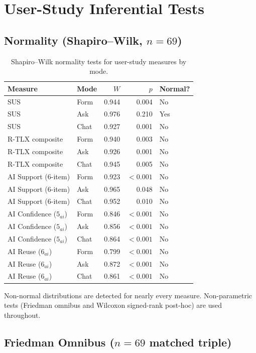 \section{User-Study Inferential Tests}
\label{app:inf-survey}

\subsection{Normality (Shapiro--Wilk, $n = 69$)}

\begin{table}[H]
\centering
\caption{Shapiro--Wilk normality tests for user-study measures by mode.}
\label{tab:app-survey-normality}
\small
\begin{tabular}{@{}l l r r l@{}}
\toprule
Measure & Mode & $W$ & $p$ & Normal? \\
\midrule
SUS & Form & 0.944 & 0.004 & No \\
SUS & Ask  & 0.976 & 0.210 & Yes \\
SUS & Chat & 0.927 & 0.001 & No \\
R-TLX composite & Form & 0.940 & 0.003 & No \\
R-TLX composite & Ask  & 0.926 & 0.001 & No \\
R-TLX composite & Chat & 0.945 & 0.005 & No \\
AI Support (6-item) & Form & 0.923 & $<0.001$ & No \\
AI Support (6-item) & Ask  & 0.965 & 0.048 & No \\
AI Support (6-item) & Chat & 0.952 & 0.010 & No \\
AI Confidence ($5_{ai}$) & Form & 0.846 & $<0.001$ & No \\
AI Confidence ($5_{ai}$) & Ask  & 0.856 & $<0.001$ & No \\
AI Confidence ($5_{ai}$) & Chat & 0.864 & $<0.001$ & No \\
AI Reuse ($6_{ai}$) & Form & 0.799 & $<0.001$ & No \\
AI Reuse ($6_{ai}$) & Ask  & 0.872 & $<0.001$ & No \\
AI Reuse ($6_{ai}$) & Chat & 0.861 & $<0.001$ & No \\
\bottomrule
\end{tabular}
\end{table}

Non-normal distributions are detected for nearly every measure. Non-parametric
tests (Friedman omnibus and Wilcoxon signed-rank post-hoc) are used
throughout.

\subsection{Friedman Omnibus ($n = 69$ matched triple)}

